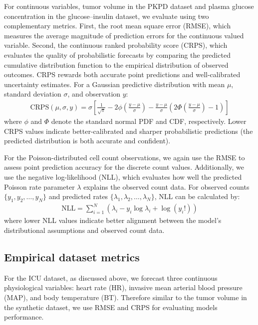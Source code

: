 \documentclass[preprint,12pt]{elsarticle}
\begin{document}
For continuous variables, tumor volume in the PKPD dataset and plasma glucose concentration in the glucose--insulin dataset, we evaluate using two complementary metrics. First, the root mean square error (RMSE), which measures the average magnitude of prediction errors for the continuous valued variable. Second, the continuous ranked probability score (CRPS), which evaluates the quality of probabilistic forecasts by comparing the predicted cumulative distribution function to the empirical distribution of observed outcomes. CRPS rewards both accurate point predictions and well-calibrated uncertainty estimates. For a Gaussian predictive distribution with mean $\mu$, standard deviation $\sigma$, and observation $y$:
    \begin{align}
            \text{CRPS}(\mu, \sigma, y) = \sigma \left[ \frac{1}{\sqrt{\pi}} - 2\phi\left( \frac{y - \mu}{\sigma} \right) - \frac{y - \mu}{\sigma} \left( 2\Phi\left( \frac{y - \mu}{\sigma} \right) - 1 \right) \right]
    \end{align}
where $\phi$ and $\Phi$ denote the standard normal PDF and CDF, respectively. Lower CRPS values indicate better-calibrated and sharper probabilistic predictions (the predicted distribution is both accurate and confident).

For the Poisson-distributed cell count observations, we again use the RMSE to assess point prediction accuracy for the discrete count values. Additionally, we use the negative log-likelihood (NLL), which evaluates how well the predicted Poisson rate parameter $\lambda$ explains the observed count data. For observed counts $\{y_1, y_2, \ldots, y_N\}$ and predicted rates $\{\lambda_1, \lambda_2, \ldots, \lambda_N\}$, NLL can be calculated by:
\begin{align}
    \text{NLL} = \sum_{i=1}^{N} (\lambda_i - y_i \log \lambda_i + \log(y_i!))
\end{align}
where lower NLL values indicate better alignment between the model's distributional assumptions and observed count data.

\subsection{Empirical dataset metrics}
For the ICU dataset, as discussed above, we forecast three continuous physiological variables: heart rate (HR), invasive mean arterial blood pressure (MAP), and body temperature (BT). Therefore similar to the tumor volume in the synthetic dataset, we use RMSE and CRPS for evaluating models performance. 
\end{document}
